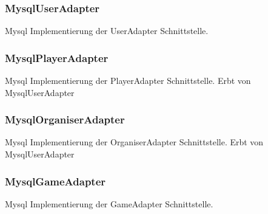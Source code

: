 \documentclass[a4paper]{scrreprt}
\begin{document}
	\subsubsection{MysqlUserAdapter}
	Mysql Implementierung der UserAdapter Schnittstelle.

	\subsubsection{MysqlPlayerAdapter}
	Mysql Implementierung der PlayerAdapter Schnittstelle.
	Erbt von MysqlUserAdapter

	\subsubsection{MysqlOrganiserAdapter}
	Mysql Implementierung der OrganiserAdapter Schnittstelle.
	Erbt von MysqlUserAdapter

	\subsubsection{MysqlGameAdapter}
	Mysql Implementierung der GameAdapter Schnittstelle.
\end{document}
